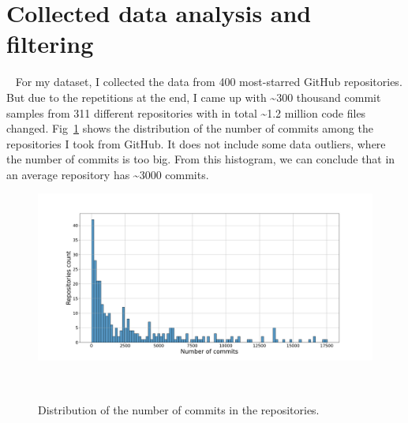 \section{Collected data analysis and filtering}~\label{sec:data_analysis}
For my dataset, I collected the data from 400 most-starred GitHub repositories. But due to the repetitions at the end, I came up with \textasciitilde{}300 thousand commit samples from 311 different repositories with in total \textasciitilde{}1.2 million code files changed. Fig~\ref{fig:commits_distribution} shows the distribution of the number of commits among the repositories I took from GitHub. It does not include some data outliers, where the number of commits is too big. From this histogram, we can conclude that in an average repository has \textasciitilde{}3000 commits. 
\begin{figure}[H]
    \includegraphics[scale=0.30]{figs/Commits distribution.png}
    \caption{Distribution of the number of commits in the repositories.}~\label{fig:commits_distribution}
\end{figure}

